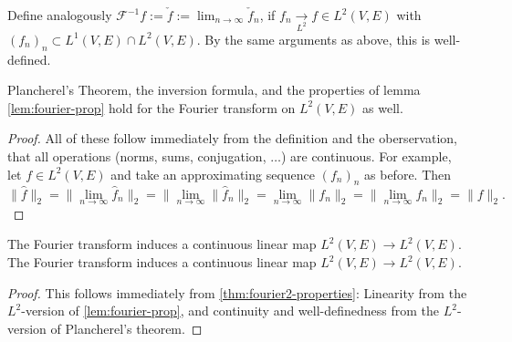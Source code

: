 \begin{definition}
  \label{def:invFourier-L2}
  \lean{}
  Define analogously $\mathcal F^{-1}f:=\check f:=\lim_{n\to\infty}\check f_n$, if $f_n\xrightarrow[L^2]{}f\in L^2(V,E)$
  with $(f_n)_n\subset L^1(V,E)\cap L^2(V,E)$. By the same arguments as above, this is well-defined.
\end{definition}

\begin{corollary}
  \label{thm:fourier2-properties}
  \lean{}
  Plancherel's Theorem, the inversion formula, and the properties of lemma \ref{lem:fourier-prop} hold
  for the Fourier transform on $L^2(V,E)$ as well.
\end{corollary}
\begin{proof}
  All of these follow immediately from the definition and the oberservation, that all operations (norms, sums, conjugation, $\ldots$) are continuous.
  For example, let $f\in L^2(V,E)$ and take an approximating sequence $(f_n)_n$ as before. Then
  $$\|\widehat f\|_2=\|\lim_{n\to\infty}\widehat f_n\|_2=\|\lim_{n\to\infty}\|\widehat f_n\|_2=\lim_{n\to\infty}\|f_n\|_2
  =\|\lim_{n\to\infty}f_n\|_2=\|f\|_2.$$
\end{proof}

\begin{corollary}
  \label{thm:fourier-is-l2-linear}
  \label{thm:fourier-is-l2-linear}
  \leanok %
  The Fourier transform induces a continuous linear map $L^2(V,E) \to L^2(V,E)$.
  The Fourier transform induces a continuous linear map $L^2(V,E) \to L^2(V,E)$.
  \end{corollary}
  \begin{proof}
    This follows immediately from \ref{thm:fourier2-properties}: Linearity from the $L^2$-version of
    \ref{lem:fourier-prop}, and continuity and well-definedness from the $L^2$-version of Plancherel's theorem.
\end{proof}